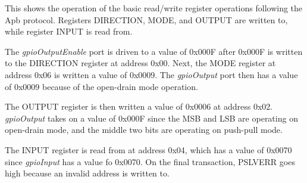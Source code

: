 This shows the operation of the basic read/write register operations following the Apb protocol. Registers DIRECTION, MODE, and OUTPUT are
written to, while register INPUT is read from.

The \textit{gpioOutputEnable} port is driven to a value of 0x000F after 0x000F is written to the DIRECTION register 
at address 0x00. Next, the MODE register at address 0x06 is written a value of 0x0009. The \textit{gpioOutput} port 
then has a value of 0x0009 because of the open-drain mode operation. 

The OUTPUT register is then written a value of 0x0006 at address 0x02. \textit{gpioOutput} takes on a value of 0x000F
since the MSB and LSB are operating on open-drain mode, and the middle two bits are operating on push-pull mode. 

The INPUT register is read from at address 0x04, which has a value of 0x0070 since \textit{gpioInput} has a value fo 0x0070.
On the final transaction, PSLVERR goes high because an invalid address is written to.

